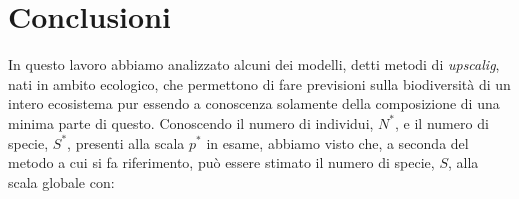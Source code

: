 \chapter{Conclusioni}




%
%
%
%

In questo lavoro abbiamo analizzato alcuni dei modelli, detti metodi di \emph{upscalig}, nati in ambito ecologico, che permettono di fare previsioni sulla biodiversità di un intero ecosistema pur essendo a conoscenza solamente della composizione  di una minima parte di questo. Conoscendo il numero di individui, $N^*$, e il numero di specie, $S^*$, presenti alla scala $p^*$ in esame, abbiamo visto che, a seconda del metodo a cui si fa riferimento, può essere stimato il numero di specie, $S$, alla scala globale con:

